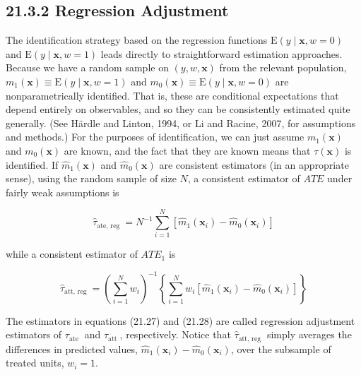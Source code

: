 \documentclass[10pt]{article}
\begin{document}
\subsection*{21.3.2 Regression Adjustment}
The identification strategy based on the regression functions $\mathrm{E}(y \mid \mathbf{x}, w=0)$ and $\mathrm{E}(y \mid \mathbf{x}, w=1)$ leads directly to straightforward estimation approaches. Because we have a random sample on $(y, w, \mathbf{x})$ from the relevant population, $m_{1}(\mathbf{x}) \equiv \mathrm{E}(y \mid \mathbf{x}, w=1)$ and $m_{0}(\mathbf{x}) \equiv \mathrm{E}(y \mid \mathbf{x}, w=0)$ are nonparametrically identified. That is, these are conditional expectations that depend entirely on observables, and so they can be consistently estimated quite generally. (See Härdle and Linton, 1994, or Li and Racine, 2007, for assumptions and methods.) For the purposes of identification, we can just assume $m_{1}(\mathbf{x})$ and $m_{0}(\mathbf{x})$ are known, and the fact that they are known means that $\tau(\mathbf{x})$ is identified. If $\hat{m}_{1}(\mathbf{x})$ and $\hat{m}_{0}(\mathbf{x})$ are consistent estimators (in an appropriate sense), using the random sample of size $N$, a consistent estimator of $A T E$ under fairly weak assumptions is


\begin{equation*}
\hat{\tau}_{\text {ate, reg }}=N^{-1} \sum_{i=1}^{N}\left[\hat{m}_{1}\left(\mathbf{x}_{i}\right)-\hat{m}_{0}\left(\mathbf{x}_{i}\right)\right] \tag{21.27}
\end{equation*}


while a consistent estimator of $A T E_{1}$ is


\begin{equation*}
\hat{\tau}_{\text {att, reg }}=\left(\sum_{i=1}^{N} w_{i}\right)^{-1}\left\{\sum_{i=1}^{N} w_{i}\left[\hat{m}_{1}\left(\mathbf{x}_{i}\right)-\hat{m}_{0}\left(\mathbf{x}_{i}\right)\right]\right\} \tag{21.28}
\end{equation*}


The estimators in equations (21.27) and (21.28) are called regression adjustment estimators of $\tau_{\text {ate }}$ and $\tau_{\text {att }}$, respectively. Notice that $\hat{\tau}_{\text {att, reg }}$ simply averages the differences in predicted values, $\hat{m}_{1}\left(\mathbf{x}_{i}\right)-\hat{m}_{0}\left(\mathbf{x}_{i}\right)$, over the subsample of treated units, $w_{i}=1$.
\end{document}
